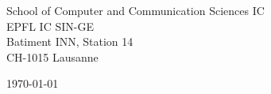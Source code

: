 \begin{minipage}{0.49\textwidth}
\begin{flushleft}
\noindent 
School of Computer and Communication Sciences IC \\
EPFL IC SIN-GE \\
Batiment INN, Station 14 \\
CH-1015 Lausanne
\end{flushleft}
\end{minipage}
\begin{minipage}{0.47\textwidth}
\begin{flushright}
\today
\end{flushright}
\end{minipage} \\

\newcommand{\univ}{Ecole Polytechnique Federale de Lausanne}
\newcommand{\univshort}{EPFL}
\newcommand{\degree}{Ph.D.}
\newcommand{\dept}{Computer Science}
